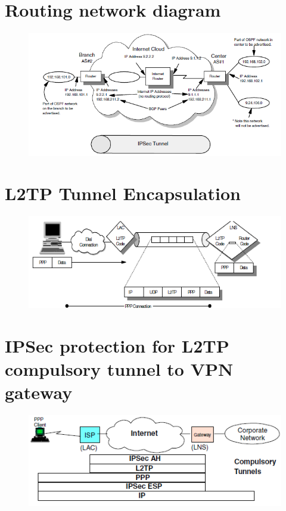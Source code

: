 \documentclass[10pt,a4paper]{article}
\begin{document}
\section{Routing network diagram}
\begin{figure}[hbtp]
\begin{flushleft}
\includegraphics[scale=1]{Routing network diagram.png}
\end{flushleft}
\end{figure}


\newpage
\section{L2TP Tunnel Encapsulation}

\begin{figure}[hbtp]
\centering
\includegraphics[scale=1]{L2TP Tunnel Encapsulation.png}
\end{figure}
\newpage
\section{IPSec protection for L2TP compulsory tunnel to VPN gateway}

\begin{figure}[hbtp]
\centering
\includegraphics[scale=1]{IPSec protection for L2TP compulsory tunnel to VPN gateway.png}
\end{figure}
\newpage
\end{document}
